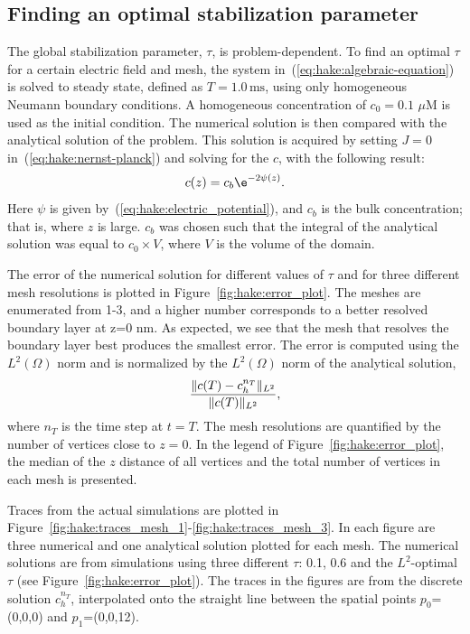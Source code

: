 \subsection{Finding an optimal stabilization parameter}
The global stabilization parameter, $\tau$, is problem-dependent. To
find an optimal $\tau$ for a certain electric field and mesh, the
system in~(\ref{eq:hake:algebraic-equation}) is solved to steady
state, defined as $T = 1.0\,\mathrm{ms}$, using only homogeneous
Neumann boundary conditions. A homogeneous concentration of $c_0=0.1$
$\mu$M is used as the initial condition. The numerical solution is
then compared with the analytical solution of the problem. This solution
is acquired by setting $J=0$ in~(\ref{eq:hake:nernst-planck}) and
solving for the $c$, with the following result:
\begin{equation}
  \label{eq:hake:analytic-solution}
  c(z) = c_b\e^{-2\psi(z)}.
\end{equation}
Here $\psi$ is given by~(\ref{eq:hake:electric_potential}), and
$c_b$ is the bulk concentration; that is, where $z$ is large. $c_b$ was
chosen such that the integral of the analytical solution was equal to
$c_0\times V$, where $V$ is the volume of the domain.

The error of the numerical solution for different values of $\tau$ and
for three different mesh resolutions is plotted in
Figure~\ref{fig:hake:error_plot}. The meshes are enumerated from 1-3,
and a higher number corresponds to a better resolved boundary layer at
z=0 nm. As expected, we see that the mesh that resolves the boundary
layer best produces the smallest error. The error is computed using
the $L^2(\Omega)$ norm and is normalized by the $L^2(\Omega)$ norm of
the analytical solution,
\begin{equation}
  \label{eq:hake:error_norm}
  \frac{\|c(T)-c_h^{n_T}\|_{L^2}}{\|c(T)\|_{L^2}},
\end{equation}
where $n_T$ is the time step at $t=T$. The mesh resolutions are
quantified by the number of vertices close to $z=0$. In the legend of
Figure~\ref{fig:hake:error_plot}, the median of the $z$ distance of all
vertices and the total number of vertices in each mesh is presented.

Traces from the actual simulations are plotted in
Figure~\ref{fig:hake:traces_mesh_1}-\ref{fig:hake:traces_mesh_3}. In
each figure are three numerical and one analytical solution plotted
for each mesh. The numerical solutions are from simulations using
three different $\tau$: 0.1, 0.6 and the $L^2$-optimal $\tau$ (see
Figure~\ref{fig:hake:error_plot}). The traces in the figures are from
the discrete solution $c_h^{n_T}$, interpolated onto the straight line
between the spatial points $p_0$=(0,0,0) and $p_1$=(0,0,12).

